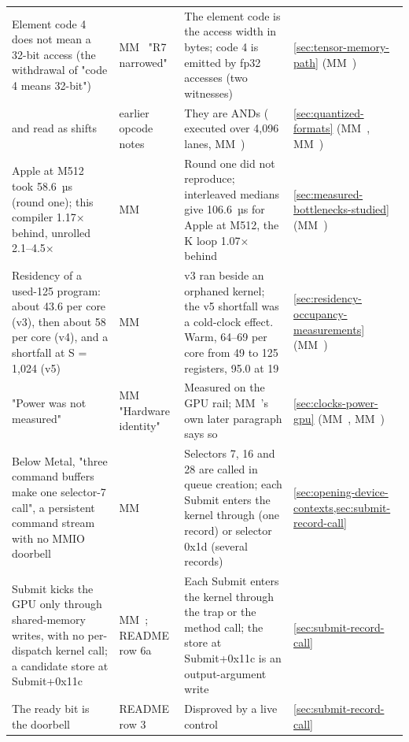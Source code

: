 \begin{xltabular}{\linewidth}{@{}>{\hsize}X>{\hsize}X>{\hsize}X>{\hsize}X@{}}
Element code 4 does not mean a 32-bit access (the withdrawal of "code 4
means 32-bit") & MM~ "R7 narrowed" & The element code is the access width in bytes; code 4 is emitted by fp32
accesses (two witnesses) & \cref{sec:tensor-memory-path} (MM~) \\
 and  read as
shifts & earlier opcode notes & They are ANDs ( executed over 4,096 lanes, MM~) & \cref{sec:quantized-formats} (MM~, MM~) \\
Apple  at M512 took 58.6~µs (round one); this compiler
1.17× behind, unrolled 2.1–4.5× & MM~ & Round one did not reproduce; interleaved medians give 106.6~µs for Apple
at M512, the K loop 1.07× behind & \cref{sec:measured-bottlenecks-studied} (MM~) \\
Residency of a used-125 program: about 43.6 per core (v3), then about 58
per core (v4), and a shortfall at S = 1,024 (v5) & MM~ & v3 ran beside an orphaned kernel; the v5 shortfall was a cold-clock
effect. Warm, 64–69 per core from 49 to 125 registers, 95.0 at 19 & \cref{sec:residency-occupancy-measurements} (MM~) \\
"Power was not measured" & MM~ "Hardware identity" & Measured on the GPU rail; MM~'s own later
paragraph says so & \cref{sec:clocks-power-gpu} (MM~, MM~) \\
Below Metal, "three command buffers make one selector-7 call", a
persistent command stream with no MMIO doorbell & MM~ & Selectors 7, 16 and 28 are called in queue creation; each Submit enters
the kernel through  (one record) or
 selector 0x1d (several records) & \cref{sec:opening-device-contexts,sec:submit-record-call} \\
Submit kicks the GPU only through shared-memory writes, with no
per-dispatch kernel call; a candidate store at Submit+0x11c & MM~; README row 6a & Each Submit enters the kernel through the trap or the method call; the
store at Submit+0x11c is an output-argument write & \cref{sec:submit-record-call} \\
The  ready bit is the doorbell & README row 3 & Disproved by a live control & \cref{sec:submit-record-call} \\
\bottomrule
\end{xltabular}
